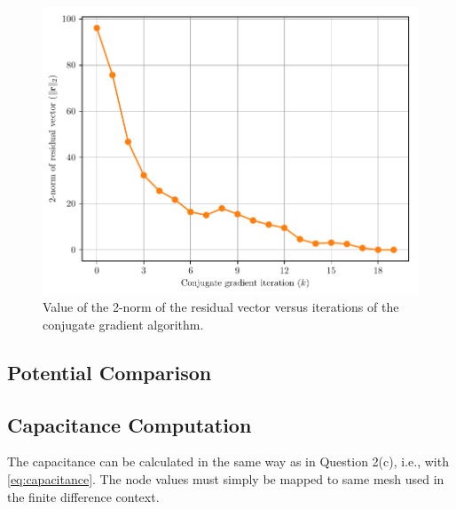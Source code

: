 \documentclass[a4paper,titlepage]{article}
\begin{document}
	\begin{figure}[!htb]
		\centering
		\includegraphics[width=\columnwidth]{plots/q3c_2.pdf}
		\caption
		{Value of the 2-norm of the residual vector versus iterations of the conjugate gradient algorithm.}
		\label{fig:q3c_2}
	\end{figure}

	\subsection{Potential Comparison}
	
	\subsection{Capacitance Computation}
	
	The capacitance can be calculated in the same way as in Question 2(c), i.e., with \cref{eq:capacitance}. The node values must simply be mapped to same mesh used in the finite difference context.
	
%
	
	\onecolumn
	
\end{document}
